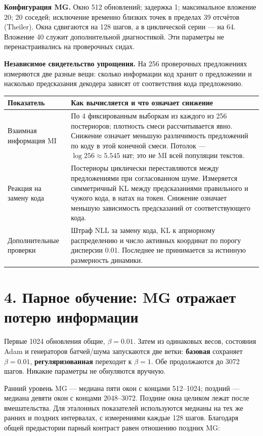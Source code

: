 \documentclass[10pt,a4paper]{article}
\begin{document}
\textbf{Конфигурация MG.} Окно 512 обновлений; задержка 1; максимальное вложение 20; 20 соседей; исключение временно близких точек в пределах 39 отсчётов (Theiler). Окна сдвигаются на 128 шагов, а в циклической серии --- на 64. Вложение 40 служит дополнительной диагностикой. Эти параметры не перенастраивались на проверочных сидах.

\textbf{Независимое свидетельство упрощения.} На 256 проверочных предложениях измеряются две разные вещи: сколько информации код хранит о предложении и насколько предсказания декодера зависят от соответствия кода предложению.

\begin{center}\small
\begin{tabularx}{\linewidth}{l>{\raggedright\arraybackslash}X}
\toprule
Показатель & Как вычисляется и что означает снижение \\
\midrule
Взаимная информация MI & По 4 фиксированным выборкам из каждого из 256 постериоров; плотность смеси рассчитывается явно. Снижение означает меньшую различимость предложений по коду в этой конечной смеси. Потолок --- $\log 256\approx5.545$ нат; это не MI всей популяции текстов. \\
Реакция на замену кода & Постериоры циклически переставляются между предложениями при согласованном шуме. Измеряется симметричный KL между предсказаниями правильного и чужого кода, в натах на токен. Снижение означает меньшую зависимость предсказаний от соответствующего кода. \\
Дополнительные проверки & Штраф NLL за замену кода, KL к априорному распределению и число активных координат по порогу дисперсии 0.01. Последнее не принимается за истинную размерность динамики. \\
\bottomrule\end{tabularx}\end{center}

\section*{4. Парное обучение: MG отражает потерю информации}

Первые 1024 обновления общие, $\beta=0.01$. Затем из одинаковых весов, состояния Adam и генераторов батчей/шума запускаются две ветки: \textbf{базовая} сохраняет $\beta=0.01$, \textbf{регуляризованная} переходит к $\beta=1$. Обе продолжаются до 3072 шагов. Никакие параметры не обнуляются вручную.

Ранний уровень MG --- медиана пяти окон с концами 512--1024; поздний --- медиана девяти окон с концами 2048--3072. Поздние окна целиком лежат после вмешательства. Для эталонных показателей используются медианы на тех же ранних и поздних интервалах, с измерениями каждые 128 шагов. Благодаря общей предыстории парный контраст равен отношению поздних MG:
\end{document}
